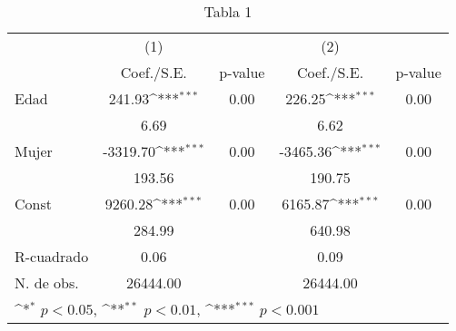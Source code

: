 \begin{table}[htbp]\centering
\def\sym#1{\ifmmode^{#1}\else\(^{#1}\)\fi}
\caption{Tabla 1}
\begin{tabular}{l*{2}{cc}}
\hline\hline
            &\multicolumn{1}{c}{(1)}         &            &\multicolumn{1}{c}{(2)}         &            \\
            &  Coef./S.E.         &     p-value&  Coef./S.E.         &     p-value\\
\hline
Edad        &      241.93\sym{***}&        0.00&      226.25\sym{***}&        0.00\\
            &        6.69         &            &        6.62         &            \\
Mujer       &    -3319.70\sym{***}&        0.00&    -3465.36\sym{***}&        0.00\\
            &      193.56         &            &      190.75         &            \\
Const       &     9260.28\sym{***}&        0.00&     6165.87\sym{***}&        0.00\\
            &      284.99         &            &      640.98         &            \\
\hline
R-cuadrado  &        0.06         &            &        0.09         &            \\
N. de obs.  &    26444.00         &            &    26444.00         &            \\
\hline\hline
\multicolumn{5}{l}{\footnotesize \sym{*} \(p<0.05\), \sym{**} \(p<0.01\), \sym{***} \(p<0.001\)}\\
\end{tabular}
\end{table}
